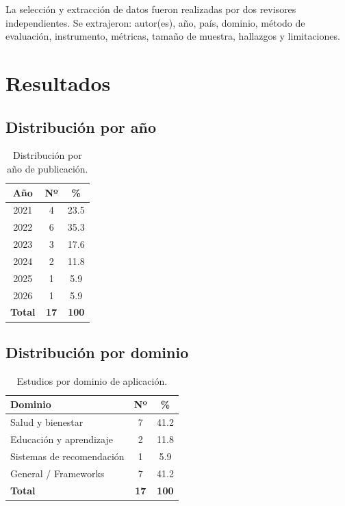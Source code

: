 \documentclass[11pt,twocolumn]{article}
\begin{document}
La selección y extracción de datos fueron realizadas por dos revisores independientes. Se extrajeron: autor(es), año, país, dominio, método de evaluación, instrumento, métricas, tamaño de muestra, hallazgos y limitaciones.

\section{Resultados}

\subsection{Distribución por año}

\begin{table}[H]
\centering
\caption{Distribución por año de publicación.}
\label{tab:anios}
\begin{tabular}{@{}ccc@{}}
\toprule
\textbf{Año} & \textbf{Nº} & \textbf{\%} \\
\midrule
2021 & 4 & 23.5 \\
2022 & 6 & 35.3 \\
2023 & 3 & 17.6 \\
2024 & 2 & 11.8 \\
2025 & 1 & 5.9 \\
2026 & 1 & 5.9 \\
\midrule
\textbf{Total} & \textbf{17} & \textbf{100} \\
\bottomrule
\end{tabular}
\end{table}

\subsection{Distribución por dominio}

\begin{table}[H]
\centering
\caption{Estudios por dominio de aplicación.}
\label{tab:dominios}
\begin{tabular}{@{}lcc@{}}
\toprule
\textbf{Dominio} & \textbf{Nº} & \textbf{\%} \\
\midrule
Salud y bienestar & 7 & 41.2 \\
Educación y aprendizaje & 2 & 11.8 \\
Sistemas de recomendación & 1 & 5.9 \\
General / Frameworks & 7 & 41.2 \\
\midrule
\textbf{Total} & \textbf{17} & \textbf{100} \\
\bottomrule
\end{tabular}
\end{table}
\end{document}

